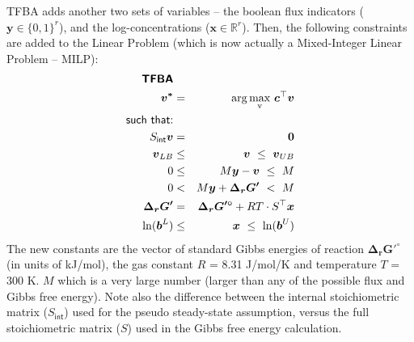 \documentclass[10pt,a4paper]{article}
\newcommand{\mymatrix}[1]{#1}
\newcommand{\myvector}[1]{{\boldsymbol{#1}}}
\newcommand{\stoichmat}{\mymatrix{S}}
\newcommand{\stoichmatint}{\mymatrix{S}_{\mathsf{int}}}
\begin{document}
TFBA adds another two sets of variables -- the boolean flux indicators ($\myvector{y} \in \{0, 1\}^r$), and the log-concentrations ($\myvector{x} \in \mathbb{R}^r$). Then, the following constraints are added to the Linear Problem (which is now actually a Mixed-Integer Linear Problem -- MILP):
\begin{eqnarray}
\textsf{\textbf{TFBA}} && \nonumber\\
\myvector{v^*} &=& \mathrm{arg\max_v} {~\myvector{c}^\top\myvector{v}}\nonumber\\
\textsf{such that:} && \nonumber\\
\stoichmatint \myvector{v} &=& \myvector{0} \nonumber\\
\myvector{v}_{LB} &\leq& \myvector{v} ~\leq~ \myvector{v}_{UB} \nonumber\\
0 &\leq& M \myvector{y} - \myvector{v} ~\leq~ M  \label{eq:tfba1}\\
0 &<& M \myvector{y} + \myvector{\Delta_r G'} ~<~ M \label{eq:tfba2} \\
\myvector{\Delta_r G'} &=& \myvector{\Delta_r G'^\circ} + RT \cdot \stoichmat^\top \myvector{x} \label{eq:tfba3}\\
\ln(\myvector{b}^L) &\leq& \myvector{x} ~\leq~ \ln(\myvector{b}^U) \label{eq:tfba4}
\end{eqnarray}
The new constants are the vector of standard Gibbs energies of reaction $\myvector{\Delta_r G'^\circ}$ (in units of kJ/mol), the gas constant $R$ = 8.31 J/mol/K and temperature $T$ = 300 K. $M$ which is a very large number (larger than any of the possible flux and Gibbs free energy). Note also the difference between the internal stoichiometric matrix ($\stoichmatint$) used for the pseudo steady-state assumption, versus the full stoichiometric matrix ($\stoichmat$) used in the Gibbs free energy calculation.
\end{document}
